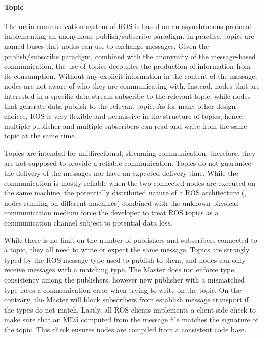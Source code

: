 \paragraph{Topic} The main communication system of ROS is based on an asynchronous protocol implementing an anonymous publish/subscribe paradigm. In practise, topics are named buses that nodes can use to exchange messages. Given the publish/subscribe paradigm, combined with the anonymity of the message-based communication, the use of topics decouples the production of information from its consumption. Without any explicit information in the content of the message, nodes are not aware of who they are communicating with. Instead, nodes that are interested in a specific data stream subscribe to the relevant topic, while nodes that generate data publish to the relevant topic. As for many other design choices, ROS is very flexible and permissive in the structure of topics, hence, multiple publisher and multiple subscribers can read and write from the same topic at the same time.

Topics are intended for unidirectional, streaming communication, therefore, they are not supposed to provide a reliable communication. Topics do not guarantee the delivery of the messages nor have an expected delivery time. While the communication is mostly reliable when the two connected nodes are executed on the same machine, the potentially distributed nature of a ROS architecture (\ie, nodes running on different machines) combined with the unknown physical communication medium force the developer to treat ROS topics as a communication channel subject to potential data loss.

While there is no limit on the number of publishers and subscribers connected to a topic, they all need to write or expect the same message. Topics are strongly typed by the ROS message type used to publish to them, and nodes can only receive messages with a matching type. The Master does not enforce type consistency among the publishers, however new publisher with a mismatched type faces a communication error when trying to write on the topic. On the contrary, the Master will block subscribers from establish message transport if the types do not match. Lastly, all ROS clients implements a client-side check to make sure that an MD5 computed from the message file matches the signature of the topic. This check ensures nodes are compiled from a consistent code base.

